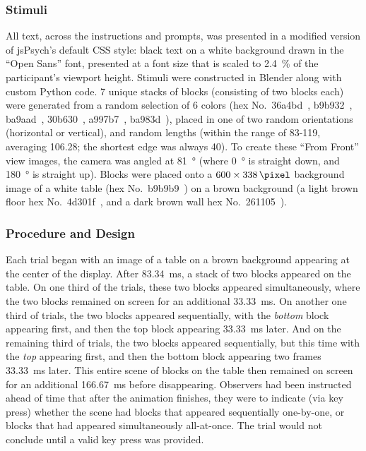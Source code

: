 \subsubsection{Stimuli}
All text, across the instructions and prompts, was presented in a modified version of jsPsych’s default CSS style: black text on a white background drawn in the “Open Sans” font, presented at a font size that is scaled to \qty{2.4}{\percent} of the participant’s viewport height.  Stimuli were constructed in Blender along with custom Python code.  7 unique stacks of blocks (consisting of two blocks each) were generated from a random selection of 6 colors (hex No.~36a4bd~, b9b932~, ba9aad~, 30b630~, a997b7~, ba983d~), placed in one of two random orientations (horizontal or vertical), and random lengths (within the range of 83-\qty{119}{\pixel}, averaging \qty{106.28}{\pixel}; the shortest edge was always \qty{40}{\pixel}). To create these “From Front” view images, the camera was angled at \qty{81}{\degree} (where \qty{0}{\degree} is straight down, and \qty{180}{\degree} is straight up).  Blocks were placed onto a $600 \times \qty{338}{\pixel}$ background image of a white table (hex No.~b9b9b9~) on a brown background (a light brown floor hex No.~4d301f~, and a dark brown wall hex No.~261105~).

\subsubsection{Procedure and Design}
Each trial began with an image of a table on a brown background appearing at the center of the display. After \qty{83.34}{\milli\second}, a stack of two blocks appeared on the table.  On one third of the trials, these two blocks appeared simultaneously, where the two blocks remained on screen for an additional \qty{33.33}{\milli\second}. On another one third of trials, the two blocks appeared sequentially, with the \textit{bottom} block appearing first, and then the top block appearing \qty{33.33}{\milli\second} later.  And on the remaining third of trials, the two blocks appeared sequentially, but this time with the \textit{top} appearing first, and then the bottom block appearing two frames \qty{33.33}{\milli\second} later.  This entire scene of blocks on the table then remained on screen for an additional \qty{166.67}{\milli\second} before disappearing.  Observers had been instructed ahead of time that after the animation finishes, they were to indicate (via key press) whether the scene had blocks that appeared sequentially one-by-one, or blocks that had appeared simultaneously all-at-once.  The trial would not conclude until a valid key press was provided.

